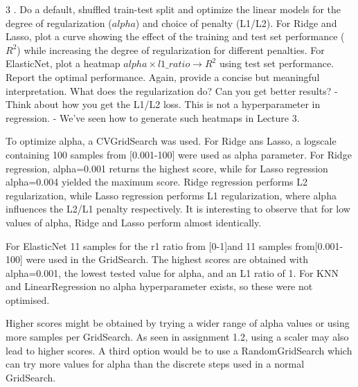 \documentclass[11pt]{article}
\begin{document}
    3 . Do a default, shuffled train-test split and optimize the linear
models for the degree of regularization (\(alpha\)) and choice of
penalty (L1/L2). For Ridge and Lasso, plot a curve showing the effect of
the training and test set performance (\(R^2\)) while increasing the
degree of regularization for different penalties. For ElasticNet, plot a
heatmap \(alpha \times l1\_ratio \rightarrow R^2\) using test set
performance. Report the optimal performance. Again, provide a concise
but meaningful interpretation. What does the regularization do? Can you
get better results? - Think about how you get the L1/L2 loss. This is
not a hyperparameter in regression. - We've seen how to generate such
heatmaps in Lecture 3.

To optimize alpha, a CVGridSearch was used. For Ridge ans Lasso, a
logscale containing 100 samples from {[}0.001-100{]} were used as alpha
parameter. For Ridge regression, alpha=0.001 returns the highest score,
while for Lasso regression alpha=0.004 yielded the maximum score. Ridge
regression performs L2 regularization, while Lasso regression performs
L1 regularization, where alpha influences the L2/L1 penalty
respectively. It is interesting to observe that for low values of alpha,
Ridge and Lasso perform almost identically.

For ElasticNet 11 samples for the r1 ratio from {[}0-1{]}and 11 samples
from{[}0.001-100{]} were used in the GridSearch. The highest scores are
obtained with alpha=0.001, the lowest tested value for alpha, and an L1
ratio of 1. For KNN and LinearRegression no alpha hyperparameter exists,
so these were not optimised.

Higher scores might be obtained by trying a wider range of alpha values
or using more samples per GridSearch. As seen in assignment 1.2, using a
scaler may also lead to higher scores. A third option would be to use a
RandomGridSearch which can try more values for alpha than the discrete
steps used in a normal GridSearch.
\end{document}
